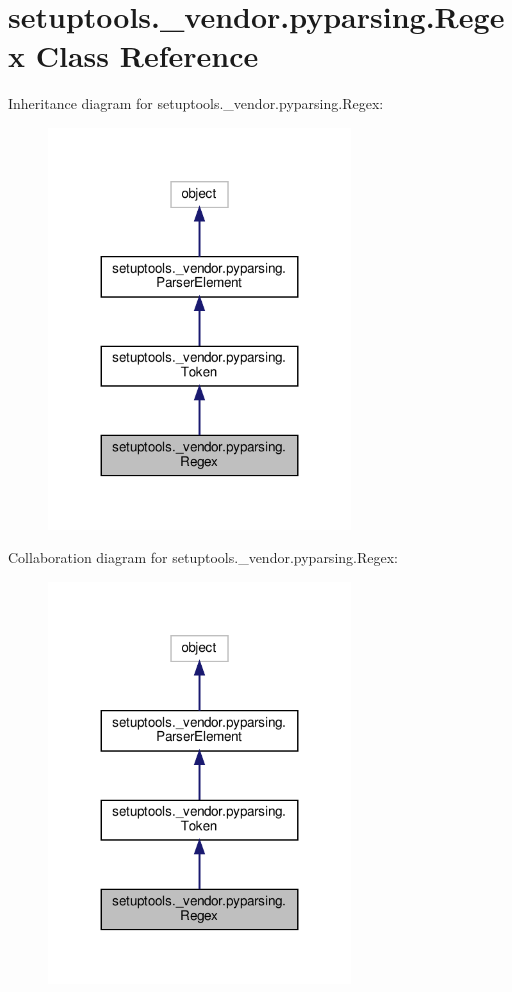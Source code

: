 \hypertarget{classsetuptools_1_1__vendor_1_1pyparsing_1_1Regex}{}\section{setuptools.\+\_\+vendor.\+pyparsing.\+Regex Class Reference}
\label{classsetuptools_1_1__vendor_1_1pyparsing_1_1Regex}


Inheritance diagram for setuptools.\+\_\+vendor.\+pyparsing.\+Regex\+:
\nopagebreak
\begin{figure}[H]
\begin{center}
\leavevmode
\includegraphics[width=227pt]{classsetuptools_1_1__vendor_1_1pyparsing_1_1Regex__inherit__graph}
\end{center}
\end{figure}


Collaboration diagram for setuptools.\+\_\+vendor.\+pyparsing.\+Regex\+:
\nopagebreak
\begin{figure}[H]
\begin{center}
\leavevmode
\includegraphics[width=227pt]{classsetuptools_1_1__vendor_1_1pyparsing_1_1Regex__coll__graph}
\end{center}
\end{figure}
